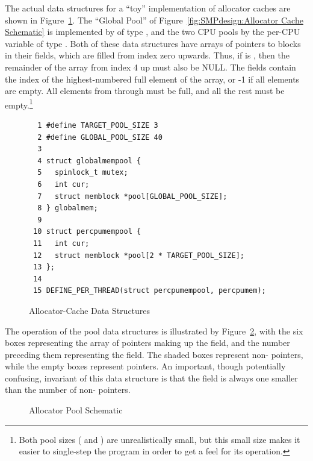 The actual data structures for a ``toy'' implementation of allocator
caches are shown in
Figure~\ref{fig:SMPdesign:Allocator-Cache Data Structures}.
The ``Global Pool'' of Figure~\ref{fig:SMPdesign:Allocator Cache Schematic}
is implemented by  of type ,
and the two CPU pools by the per-CPU variable  of
type .
Both of these data structures have arrays of pointers to blocks
in their  fields, which are filled from index zero upwards.
Thus, if  is , then the remainder of
the array from index 4 up must also be NULL.
The  fields contain the index of the highest-numbered full
element of the  array, or -1 if all elements are empty.
All elements from  through
 must be full, and all the rest
must be empty.\footnote{
	Both pool sizes ( and
	) are unrealistically small, but this small
	size makes it easier to single-step the program in order to get
	a feel for its operation.}

\begin{figure}[htbp]
{ \scriptsize
\begin{verbatim}
  1 #define TARGET_POOL_SIZE 3
  2 #define GLOBAL_POOL_SIZE 40
  3
  4 struct globalmempool {
  5   spinlock_t mutex;
  6   int cur;
  7   struct memblock *pool[GLOBAL_POOL_SIZE];
  8 } globalmem;
  9
 10 struct percpumempool {
 11   int cur;
 12   struct memblock *pool[2 * TARGET_POOL_SIZE];
 13 };
 14
 15 DEFINE_PER_THREAD(struct percpumempool, percpumem);
\end{verbatim}
}
\caption{Allocator-Cache Data Structures}
\label{fig:SMPdesign:Allocator-Cache Data Structures}
\end{figure}

The operation of the pool data structures is illustrated by
Figure~\ref{fig:SMPdesign:Allocator Pool Schematic},
with the six boxes representing the array of pointers making up
the  field, and the number preceding them representing
the  field.
The shaded boxes represent non- pointers, while the empty
boxes represent  pointers.
An important, though potentially confusing, invariant of this
data structure is that the  field is always one
smaller than the number of non- pointers.

\begin{figure}[htb]
\begin{center}
\end{center}
\caption{Allocator Pool Schematic}
\label{fig:SMPdesign:Allocator Pool Schematic}
\end{figure}

